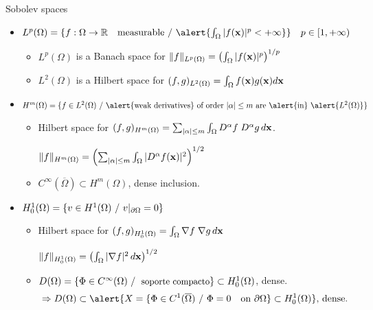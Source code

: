\begin{frame}{Sobolev spaces}
  \small
  \begin{itemize}
  \setlength\itemsep{0.5em}
  \item
    $L^p(\Omega)=\{ f: \Omega \to \Rset \quad \text{measurable} \st
    \alert{\int_\Omega |f(\xx)|^p < +\infty} \} \quad p \in [1,+\infty)$
    \begin{itemize}
      \setlength\itemsep{0.3em}
      \scriptsize
    \item $L^p(\Omega)$ is a Banach space for
      $\norm[L^p(\Omega)]{f}=\left(\int_\Omega|f(\xx)|^p\right)^{1/p}$
    \item \alert{$L^2(\Omega)$} is a Hilbert space for $(f,g)_{L^2(\Omega)}=\int_\Omega f(\xx) g(\xx) d\xx$
    \end{itemize}

  \item
    $ H^m(\Omega) = \{ f\in L^2(\Omega) \st \text{\alert{weak derivatives} of
      order $|\alpha| \le m$ are \alert{in} } \alert{L^2(\Omega)} \} $
    \begin{itemize}
      \setlength\itemsep{0.3em}
      \scriptsize
    \item Hilbert space for
      $(f,g)_{H^m(\Omega)}=\sum_{|\alpha|\le m} \int_\Omega D^\alpha f
      \; D^\alpha g \,d\xx$.
      \par {} \quad
      $\norm[H^m(\Omega)]{f}=\left(\sum_{|\alpha|\le m} \int_\Omega|D^\alpha f(\xx)|^2\right)^{1/2}$
      \item $C^\infty(\overline\Omega) \subset H^m(\Omega)$, dense inclusion.
    \end{itemize}

  \item \alert{$H_0^1(\Omega) = \{ v \in H^1(\Omega) \st v|_{\partial\Omega}=0 \}$}
     \hfill{}
    \begin{itemize}
      \setlength\itemsep{0.3em}
      \scriptsize
    \item Hilbert space for
      $(f,g)_{H_0^1(\Omega)}=\int_\Omega \grad f \; \grad g \, d\xx $
      \par {} \quad
      $\norm[H_0^1(\Omega)]{f}=\left(\int_\Omega|\grad f|^2\, d\xx\right)^{1/2}$
    \item $D(\Omega) =\{ \small \Phi\in C^\infty(\Omega) \st \text{ soporte compacto} \}
      \subset H_0^1(\Omega)$, dense.
       \small
     $$\Rightarrow
      D(\Omega) \subset \alert{X=\{ \Phi\in C^1(\overline\Omega) \st \Phi=0 \quad \mbox{on
      } \partial\Omega\} \subset H_0^1(\Omega)} \text{, dense}.$$
    \end{itemize}
  \end{itemize}
\end{frame}

